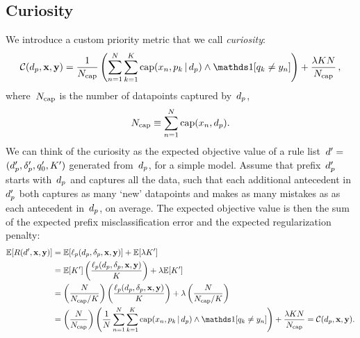\begin{kdd}
\vspace{-1mm}
\end{kdd}

\begin{arxiv}
\section{Curiosity}

We introduce a custom priority metric that we call \emph{curiosity}:
\begin{align}
\Curiosity(\Prefix, \x, \y) = \frac{1}{\NCap} \left(\sum_{n=1}^N \sum_{k=1}^K
  \Cap(x_n, p_k \given \Prefix) \wedge \one [ q_k \neq y_n ] \right)
  + \frac{\Reg K N}{\NCap} \,,
\end{align}
where~$N_{\textnormal{cap}}$ is the number of datapoints captured by~$d_p$, \ie
\begin{align}
N_{\textnormal{cap}} \equiv \sum_{n=1}^N \textnormal{cap}(x_n, d_p).
\end{align}
%
We can think of the curiosity as the expected objective value
of a rule list~${{d}' = }$ ${(d_p', \delta_p', q_0', K')}$
generated from~$d_p$, for a simple model.
%
Assume that prefix~$d_p'$ starts with~$d_p$ and captures all the data,
such that each additional antecedent in~$d_p'$
both captures as many `new' datapoints and makes as many mistakes as
as each antecedent in~$d_p$, on average.
%
The expected objective value is then the sum of the expected prefix
misclassification error and the expected regularization penalty:
\begin{align}
\E[ \Obj(\RL', \x, \y) ] &= \E[\Loss_p(\Prefix, \Labels, \x, \y)] + \E[ \Reg K' ] \nn \\
&= \E[ K' ] \left(\frac{\Loss_p(\Prefix, \Labels, \x, \y)}{K}\right) + \Reg \E[ K' ] \nn \\
&=  \left(\frac{N}{\NCap / K}\right)
  \left(\frac{\Loss_p(\Prefix, \Labels, \x, \y)}{K}\right)
  + \Reg \left(\frac{N}{\NCap / K}\right) \nn \\
&= \left(\frac{N}{\NCap}\right) \left(\frac{1}{N} \sum_{n=1}^N \sum_{k=1}^K
  \Cap(x_n, p_k \given \Prefix) \wedge \one [ q_k \neq y_n ] \right)
  + \frac{\Reg K N}{\NCap} = \Curiosity(\Prefix, \x, \y).
\end{align}
\end{arxiv}

